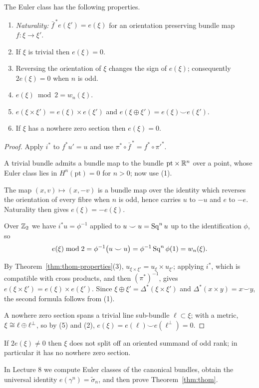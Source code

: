 \begin{theorem}\label{thm:euler-properties}
The Euler class has the following properties.

\begin{enumerate}
\item \emph{Naturality:} $\bar f^{\,*}e(\xi')=e(\xi)$ for an orientation
preserving bundle map $f\colon\xi\to\xi'$.
\item If $\xi$ is trivial then $e(\xi)=0$.
\item Reversing the orientation of $\xi$ changes the sign of $e(\xi)$;
consequently $2e(\xi)=0$ when $n$ is odd.
\item $e(\xi)\bmod2=w_n(\xi)$.
\item $e(\xi\times\xi')=e(\xi)\times e(\xi')$ and
$e(\xi\oplus\xi')=e(\xi)\smile e(\xi')$.
\item If $\xi$ has a nowhere zero section then $e(\xi)=0$.
\end{enumerate}
\end{theorem}

\begin{proof}
 Apply $i^*$ to $f^*u'=u$ and use
$\pi^*\circ\bar f^{\,*}=f^*\circ\pi'^*$.

 A trivial bundle admits a bundle map to the bundle
$\mathrm{pt}\times\mathbb{R}^n$ over a point, whose Euler class lies in
$H^{n}(\mathrm{pt})=0$ for $n>0$; now use (1).

 The map $(x,v)\mapsto(x,-v)$ is a bundle map over the identity which
reverses the orientation of every fibre when $n$ is odd, hence carries $u$ to
$-u$ and $e$ to $-e$. Naturality then gives $e(\xi)=-e(\xi)$.

 Over $\mathbb{Z}_2$ we have $i^*u=\phi^{-1}$ applied to $u\smile u=\operatorname{Sq}^nu$ up
to the identification $\phi$, so
\[
e(\xi)\bmod2=\phi^{-1}\big(u\smile u\big)=\phi^{-1}\operatorname{Sq}^n\phi(1)=w_n(\xi).
\]

 By Theorem~\ref{thm:thom-properties}(3),
$u_{\xi\times\xi'}=u_\xi\times u_{\xi'}$; applying $i^*$, which is compatible
with cross products, and then $(\pi^*)^{-1}$, gives
$e(\xi\times\xi')=e(\xi)\times e(\xi')$. Since
$\xi\oplus\xi'=\Delta^*(\xi\times\xi')$ and
$\Delta^*(x\times y)=x\smile y$, the second formula follows from (1).

 A nowhere zero section spans a trivial line sub-bundle $\ell\subset\xi$;
with a metric, $\xi\cong\ell\oplus\ell^{\perp}$, so by (5) and (2),
$e(\xi)=e(\ell)\smile e(\ell^\perp)=0$.
\end{proof}

\begin{corollary}
If $2e(\xi)\neq0$ then $\xi$ does not split off an oriented summand of odd rank;
in particular it has no nowhere zero section.
\end{corollary}

In Lecture 8 we compute Euler classes of the canonical bundles, obtain the
universal identity $e(\gamma^n)=\tilde\sigma_n$, and then prove
Theorem~\ref{thm:thom}.
